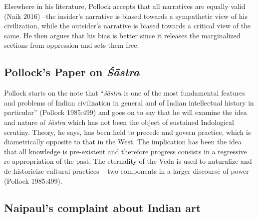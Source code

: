 Elsewhere in his literature, Pollock accepts that all narratives are equally valid (Naik 2016) --the insider's narrative is biased towards a sympathetic view of his civilization, while the outsider's narrative is biased towards a critical view of the same. He then argues that his bias is better since it releases the marginalized sections from oppression and sets them free.

\subsection{Pollock's Paper on {{\sl\bfseries Śāstra}\relax}}\label{art12-sec3.1}

Pollock starts on the note that ``{\sl śāstra} is one of the most fundamental features and problems of Indian civilization in general and of Indian intellectual history in particular'' (Pollock 1985:499) and goes on to say that he will examine the idea and nature of {\sl śāstra} which has not been the object of sustained Indological scrutiny. Theory, he says, has been held to precede and govern practice, which is diametrically opposite to that in the West. The implication has been the idea that all knowledge is pre-existent and therefore progress consists in a regressive re-appropriation of the past. The eternality of the Veda is used to naturalize and de-historicize cultural practices -- two components in a larger discourse of power (Pollock 1985:499).

\subsection{Naipaul's complaint about Indian art}\label{art12-sec3.2}

